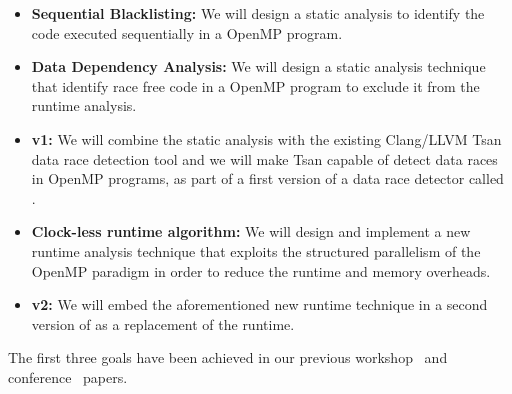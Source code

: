 \begin{itemize}
\item \textbf{Sequential Blacklisting:} We will design a static analysis to
  identify the code executed sequentially in a OpenMP program.
\item \textbf{Data Dependency Analysis:} We will design a static analysis
  technique that identify race free code in a OpenMP program to exclude it
  from the runtime analysis.
\item \textbf{\archer v1:} We will combine the static analysis with the
  existing Clang/LLVM Tsan data race detection tool and we will make Tsan
  capable of detect data races in OpenMP programs, as part of a first version
  of a data race detector called \archer.
\item \textbf{Clock-less runtime algorithm:} We will design and implement a
  new runtime analysis technique that exploits the structured parallelism of
  the OpenMP paradigm in order to reduce the runtime and memory overheads.
\item \textbf{\archer v2:} We will embed the aforementioned new runtime
  technique in a second version of \archer as a replacement of the \tsan
  runtime.
\end{itemize}

The first three goals have been achieved in our previous
workshop~\cite{Protze:2014:TPL:2688361.2688369} and
conference~\cite{atzeni2016} papers.

